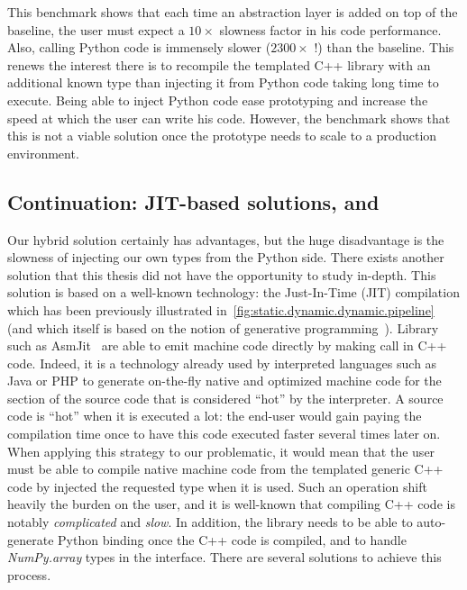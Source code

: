 This benchmark shows that each time an abstraction layer is added on top of the baseline, the user must expect a
\(10\times\) slowness factor in his code performance. Also, calling Python code is immensely slower (\(2300\times\) !)
than the baseline. This renews the interest there is to recompile the templated C++ library with an additional known
type than injecting it from Python code taking long time to execute. Being able to inject Python code ease prototyping
and increase the speed at which the user can write his code. However, the benchmark shows that this is not a viable
solution once the prototype needs to scale to a production environment.


\subsection{Continuation: JIT-based solutions, \pros and \cons}

Our hybrid solution certainly has advantages, but the huge disadvantage is the slowness of injecting our own types from
the Python side. There exists another solution that this thesis did not have the opportunity to study in-depth. This
solution is based on a well-known technology: the Just-In-Time (JIT) compilation which has been previously illustrated
in~\cref{fig:static.dynamic.dynamic.pipeline} (and which itself is based on the notion of generative
programming~\parencite{czarnecki.2000.generative}). Library such as AsmJit~\parencite{kobalicek.2011.asmjit} are able to
emit machine code directly by making call in C++ code. Indeed, it is a technology already used by interpreted languages
such as Java or PHP to generate on-the-fly native and optimized machine code for the section of the source code that is
considered ``hot'' by the interpreter. A source code is ``hot'' when it is executed a lot: the end-user would gain
paying the compilation time once to have this code executed faster several times later on. When applying this strategy
to our problematic, it would mean that the user must be able to compile native machine code from the templated generic
C++ code by injected the requested type when it is used. Such an operation shift heavily the burden on the user, and it
is well-known that compiling C++ code is notably \emph{complicated} and \emph{slow}. In addition, the library needs to
be able to auto-generate Python binding once the C++ code is compiled, and to handle \emph{NumPy.array} types in the
interface. There are several solutions to achieve this process.

